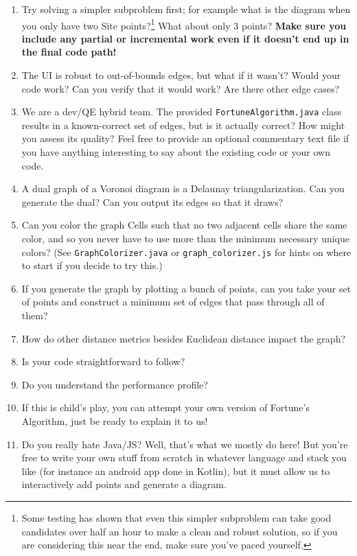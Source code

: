 \documentclass[12pt]{article}
\begin{document}
\begin{enumerate}
  \item Try solving a simpler subproblem first; for example what is the diagram
    when you only have two Site points?\footnote{Some testing has shown that even this simpler subproblem can take
    good candidates over half an hour to make a clean and robust solution, so if you
    are considering this near the end, make sure you've paced yourself.} What about only 3 points? \textbf{Make
    sure you include any partial or incremental work even if it doesn't end up in the final code
    path!}
  \item The UI is robust to out-of-bounds edges, but what if it wasn't? Would
    your code work? Can you verify that it would work? Are there other edge
    cases?
  \item We are a dev/QE hybrid team. The provided \texttt{FortuneAlgorithm.java}
    class results in a known-correct set of edges, but is it actually correct?
    How might you assess its quality? Feel free to provide an optional commentary text
    file if you have anything interesting to say about the existing code or your
    own code.
  \item A dual graph of a Voronoi diagram is a Delaunay triangularization. Can
    you generate the dual? Can you output its edges so that it draws?
  \item Can you color the graph Cells such that no two adjacent cells share the
    same color, and so you never have to use more than the minimum necessary
    unique colors? (See \texttt{GraphColorizer.java} or
    \texttt{graph\_colorizer.js} for hints on where to start if you decide to
    try this.)
  \item If you generate the graph by plotting a bunch of points, can you take
    your set of points and construct a minimum set of edges that pass through
    all of them?
  \item How do other distance metrics besides Euclidean distance impact the
    graph?
  \item Is your code straightforward to follow?
  \item Do you understand the performance profile?
  \item If this is child's play, you can attempt your own version of Fortune's
    Algorithm, just be ready to explain it to us!
  \item Do you really hate Java/JS? Well, that's what we mostly do here! But
    you're free to write your own stuff from scratch in whatever language and
    stack you like (for instance an android app done in Kotlin), but it must
    allow us to interactively add points and generate a diagram.

\end{enumerate}
\end{document}
